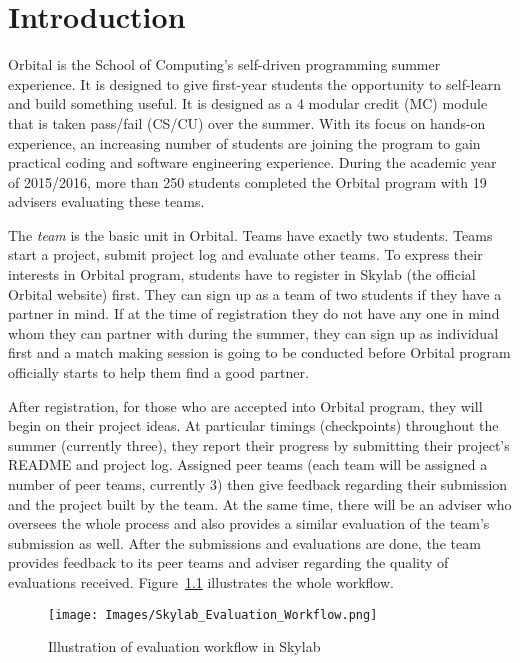 \chapter{Introduction} \label{introduction}

Orbital is the School of Computing's self-driven programming summer experience. It is designed to give first-year students the opportunity to self-learn and build something useful. It is designed as a 4 modular credit (MC) module that is taken pass/fail (CS/CU) over the summer\cite{citation0}. With its focus on hands-on experience, an increasing number of students are joining the program to gain practical coding and software engineering experience. During the academic year of 2015/2016, more than 250 students completed the Orbital program with 19 advisers evaluating these teams.

The {\it team} is the basic unit in Orbital.  Teams have exactly two students.  Teams start a project, submit project log and evaluate other teams. To express their interests in Orbital program, students have to register in Skylab (the official Orbital website) first. They can sign up as a team of two students if they have a partner in mind. If at the time of registration they do not have any one in mind whom they can partner with during the summer, they can sign up as individual first and a match making session is going to be conducted before Orbital program officially starts to help them find a good partner.
  
After registration, for those who are accepted into Orbital program, they will begin on their project ideas.  At particular timings (checkpoints) throughout the summer (currently three), they report their progress by submitting their project's README and project log.  Assigned peer teams (each team will be assigned a number of peer teams, currently 3) then give feedback regarding their submission and the project built by the team. At the same time, there will be an adviser who oversees the whole process and also provides a similar evaluation of the team's submission as well. After the submissions and evaluations are done, the team provides feedback to its peer teams and adviser regarding the quality of evaluations received. Figure~\ref{fig:EvaluationWorkflow} illustrates the whole workflow.

\begin{figure}[h]
  \centering
  \texttt{[image: Images/Skylab\_Evaluation\_Workflow.png]}
  \caption{Illustration of evaluation workflow in Skylab}
  \label{fig:EvaluationWorkflow}
\end{figure}

